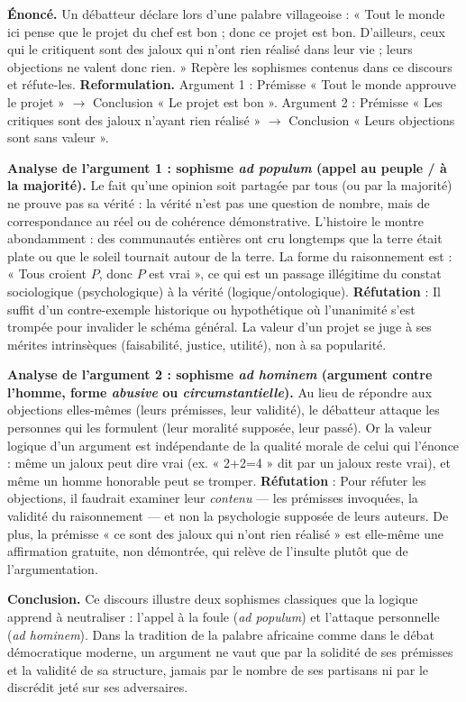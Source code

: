 \documentclass[11pt]{article}
\begin{document}
\begin{exoresolu}
\textbf{Énoncé.} Un débatteur déclare lors d'une palabre villageoise : « Tout le monde ici pense que le projet du chef est bon ; donc ce projet est bon. D'ailleurs, ceux qui le critiquent sont des jaloux qui n'ont rien réalisé dans leur vie ; leurs objections ne valent donc rien. » Repère les sophismes contenus dans ce discours et réfute-les.
\tcblower
\textbf{Reformulation.}
Argument 1 : Prémisse « Tout le monde approuve le projet » $\rightarrow$ Conclusion « Le projet est bon ».
Argument 2 : Prémisse « Les critiques sont des jaloux n'ayant rien réalisé » $\rightarrow$ Conclusion « Leurs objections sont sans valeur ».

\textbf{Analyse de l'argument 1 : sophisme \emph{ad populum} (appel au peuple / à la majorité).}
Le fait qu'une opinion soit partagée par tous (ou par la majorité) ne prouve pas sa vérité : la vérité n'est pas une question de nombre, mais de correspondance au réel ou de cohérence démonstrative. L'histoire le montre abondamment : des communautés entières ont cru longtemps que la terre était plate ou que le soleil tournait autour de la terre. La forme du raisonnement est : « Tous croient $P$, donc $P$ est vrai », ce qui est un passage illégitime du constat sociologique (psychologique) à la vérité (logique/ontologique).
\textbf{Réfutation} : Il suffit d'un contre-exemple historique ou hypothétique où l'unanimité s'est trompée pour invalider le schéma général. La valeur d'un projet se juge à ses mérites intrinsèques (faisabilité, justice, utilité), non à sa popularité.

\textbf{Analyse de l'argument 2 : sophisme \emph{ad hominem} (argument contre l'homme, forme \textit{abusive} ou \textit{circumstantielle}).}
Au lieu de répondre aux objections elles-mêmes (leurs prémisses, leur validité), le débatteur attaque les personnes qui les formulent (leur moralité supposée, leur passé). Or la valeur logique d'un argument est indépendante de la qualité morale de celui qui l'énonce : même un jaloux peut dire vrai (ex. « 2+2=4 » dit par un jaloux reste vrai), et même un homme honorable peut se tromper.
\textbf{Réfutation} : Pour réfuter les objections, il faudrait examiner leur \emph{contenu} — les prémisses invoquées, la validité du raisonnement — et non la psychologie supposée de leurs auteurs. De plus, la prémisse « ce sont des jaloux qui n'ont rien réalisé » est elle-même une affirmation gratuite, non démontrée, qui relève de l'insulte plutôt que de l'argumentation.

\textbf{Conclusion.} Ce discours illustre deux sophismes classiques que la logique apprend à neutraliser : l'appel à la foule (\emph{ad populum}) et l'attaque personnelle (\emph{ad hominem}). Dans la tradition de la palabre africaine comme dans le débat démocratique moderne, un argument ne vaut que par la solidité de ses prémisses et la validité de sa structure, jamais par le nombre de ses partisans ni par le discrédit jeté sur ses adversaires.
\end{exoresolu}
\end{document}
